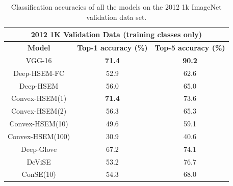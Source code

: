 \documentclass[12pt]{report}
\begin{document}
\begin{table}
\centering
\begin{tabular}{@{}ccc@{}}
\toprule
\multicolumn{3}{c}{\textbf{2012 1K Validation Data (training classes only)}}                                                                        \\ \midrule
\multicolumn{1}{c}{\textbf{Model}}          & \multicolumn{1}{c}{\textbf{Top-1 accuracy (\%)}} & \multicolumn{1}{c}{\textbf{Top-5 accuracy (\%)}} \\ \midrule
\multicolumn{1}{c}{VGG-16}                  & \multicolumn{1}{c}{\textbf{71.4}}               & \multicolumn{1}{c}{\textbf{90.2}}                        \\
\multicolumn{1}{c}{Deep-HSEM-FC}            & \multicolumn{1}{c}{52.9}                        & \multicolumn{1}{c}{62.6}                        \\
\multicolumn{1}{c}{Deep-HSEM}               & \multicolumn{1}{c}{56.0}                        & \multicolumn{1}{c}{65.0}                        \\
\multicolumn{1}{c}{Convex-HSEM(1)}          & \multicolumn{1}{c}{\textbf{71.4}}              & \multicolumn{1}{c}{73.6}                        \\
\multicolumn{1}{c}{Convex-HSEM(2)}          & \multicolumn{1}{c}{56.3}                        & \multicolumn{1}{c}{65.3}                        \\
\multicolumn{1}{c}{Convex-HSEM(10)}         & \multicolumn{1}{c}{49.6}                        & \multicolumn{1}{c}{59.1}                        \\
\multicolumn{1}{c}{Convex-HSEM(100)}        & \multicolumn{1}{c}{30.9}                        & \multicolumn{1}{c}{40.6}                        \\
\multicolumn{1}{c}{Deep-Glove}              & \multicolumn{1}{c}{67.2}                        & \multicolumn{1}{c}{74.1}                        \\
\multicolumn{1}{c}{DeViSE \cite{Frome2013}} & \multicolumn{1}{c}{53.2}                        & \multicolumn{1}{c}{76.7}                        \\
\multicolumn{1}{c}{ConSE(10) \cite{Norouzi2013}}  & \multicolumn{1}{c}{54.3}                  & \multicolumn{1}{c}{68.0}                        \\ 
\bottomrule
\end{tabular}
\caption{Classification accuracies of all the models on the 2012 1k ImageNet validation data set.}
\label{tbl:train}
\end{table}
\end{document}
